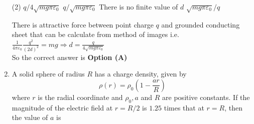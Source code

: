 \begin{enumerate}[label=\color{ocre}\textbf{\arabic*.}]
\begin{tasks}(2)
\task[\textbf{A.}] $q / 4 \sqrt{m g \pi \varepsilon_{0}}$
\task[\textbf{B.}] $q / \sqrt{m g \pi \varepsilon_{0}}$
\task[\textbf{C.}] There is no finite value of $d$
\task[\textbf{D.}]  $\sqrt{m g \pi \varepsilon_{0}} / q$
\end{tasks}
\begin{answer}
There is attractive force between point charge $q$ and grounded conducting sheet that can be calculate from method of images i.e. $\frac{1}{4 \pi \varepsilon_{0}} \frac{q^{2}}{(2 d)^{2}}=m g \Rightarrow d=\frac{q}{4 \sqrt{m g \pi \varepsilon_{0}}}$\\
So the correct answer is \textbf{Option (A)}
\end{answer}
\item A solid sphere of radius $R$ has a charge density, given by
$$
\rho(r)=\rho_{0}\left(1-\frac{a r}{R}\right)
$$
where $r$ is the radial coordinate and $\rho_{0}, a$ and $R$ are positive constants. If the magnitude of the electric field at $r=R / 2$ is $1.25$ times that at $r=R$, then the value of $a$ is
{}


\end{enumerate}
